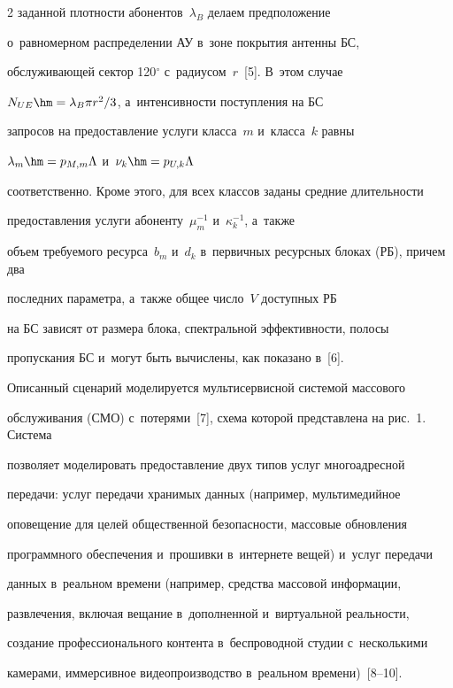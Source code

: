 \begin{multicols}{2}
заданной плот\-ности абонентов~$\lambda_B$ делаем предположение 

о~равномерном распределении АУ в~зоне покрытия антенны БС, 

об\-слу\-жи\-ва\-ющей сектор 120$^\circ$ с~радиусом~$r$~[5]. В~этом случае 

$N_{UE}\hm= \lambda_B \pi r^2/3$, а~интенсивности по\-ступ\-ле\-ния на БС 

запросов на предостав\-ле\-ние услуги класса~$m$ и~класса~$k$ равны 

$\lambda_m\hm= p_{M,m}\Lambda$ и~$\nu_k\hm= p_{U,k}\Lambda$ 

соответственно. Кроме этого, для всех классов заданы сред\-ние длительности 

предостав\-ле\-ния услуги абоненту~$\mu_m^{-1}$ и~$\kappa_k^{-1}$, а~так\-же 

объем требуемого ресурса~$b_m$ и~$d_k$ в~первичных ресурсных блоках (РБ), причем два 

последних па\-ра\-мет\-ра, а~так\-же общее чис\-ло~$V$ доступных РБ 

на БС зависят от размера блока, спект\-раль\-ной эф\-фек\-тив\-ности, полосы 

пропускания БС и~могут быть вы\-чис\-ле\-ны, как показано в~[6].





  Описанный сценарий моделируется мультисервисной сис\-те\-мой массового 

обслуживания (СМО) с~потерями~[7], схема которой пред\-став\-ле\-на на рис.~1. Сис\-те\-ма 

поз\-во\-ля\-ет моделировать предостав\-ле\-ние двух типов услуг многоадресной 

передачи: услуг передачи хранимых данных (например, мультимедийное 

оповещение для целей общественной безопас\-ности, массовые обновления 

программного обеспечения и~про\-шив\-ки в~интернете вещей) и~услуг \mbox{передачи} 

данных в~реальном времени (например, средства массовой информации, 

развлечения, включая вещание в~дополненной и~виртуальной ре\-аль\-ности, 

создание профессионального \mbox{контента} в~беспроводной студии с~несколькими 

камерами, иммерсивное видеопроизводство в~реальном времени)~[8--10]. 


\end{multicols}
